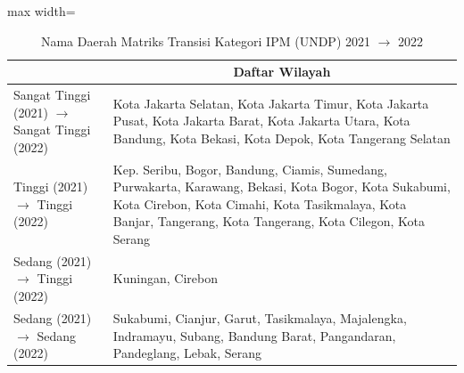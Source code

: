 \begin{table}[H]
\centering
\caption{Nama Daerah Matriks Transisi Kategori IPM (UNDP) 2021 \(\rightarrow\) 2022} \label{tab:app1ipmname2021x2022}
\begin{adjustbox}{max width=\textwidth}
\begin{tabular}{|>{\centering\arraybackslash}p{4cm}|p{10cm}|}
\hline
\multicolumn{1}{|c|}{\textbf{Kategori}} & \multicolumn{1}{c|}{\textbf{Daftar Wilayah}} \\
\hline
Sangat Tinggi (2021) \(\rightarrow\) Sangat Tinggi (2022) & Kota Jakarta Selatan, Kota Jakarta Timur, Kota Jakarta Pusat, Kota Jakarta Barat, Kota Jakarta Utara, Kota Bandung, Kota Bekasi, Kota Depok, Kota Tangerang Selatan \\
\hline
Tinggi (2021) \(\rightarrow\) Tinggi (2022) & Kep. Seribu, Bogor, Bandung, Ciamis, Sumedang, Purwakarta, Karawang, Bekasi, Kota Bogor, Kota Sukabumi, Kota Cirebon, Kota Cimahi, Kota Tasikmalaya, Kota Banjar, Tangerang, Kota Tangerang, Kota Cilegon, Kota Serang \\
\hline
Sedang (2021) \(\rightarrow\) Tinggi (2022) & Kuningan, Cirebon \\
\hline
Sedang (2021) \(\rightarrow\) Sedang (2022) & Sukabumi, Cianjur, Garut, Tasikmalaya, Majalengka, Indramayu, Subang, Bandung Barat, Pangandaran, Pandeglang, Lebak, Serang \\
\hline
\end{tabular}
\end{adjustbox}
\end{table}